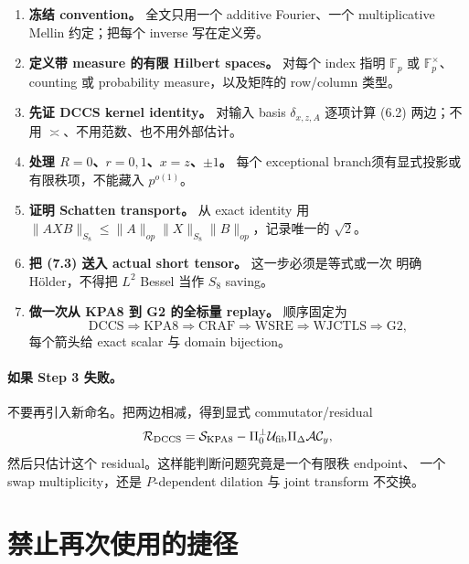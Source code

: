 \documentclass[11pt,a4paper]{ctexart}
\theoremstyle{definition}
\newcommand{\F}{\mathbb F}
\begin{document}
\begin{enumerate}[label=\textbf{Step \arabic*.}]
\item \textbf{冻结 convention。} 全文只用一个 additive Fourier、一个
multiplicative Mellin 约定；把每个 inverse 写在定义旁。
\item \textbf{定义带 measure 的有限 Hilbert spaces。} 对每个 index 指明
$\F_p$ 或 $\F_p^\times$、counting 或 probability measure，以及矩阵的 row/column 类型。
\item \textbf{先证 DCCS kernel identity。} 对输入 basis
$\delta_{x,z,A}$ 逐项计算 (6.2) 两边；不用 $\asymp$、不用范数、也不用外部估计。
\item \textbf{处理 $R=0$、$r=0,1$、$x=z$、$\pm1$。} 每个 exceptional
branch须有显式投影或有限秩项，不能藏入 $p^{o(1)}$。
\item \textbf{证明 Schatten transport。} 从 exact identity 用
$\|AXB\|_{S_8}\le\|A\|_{op}\|X\|_{S_8}\|B\|_{op}$，记录唯一的 $\sqrt2$。
\item \textbf{把 (7.3) 送入 actual short tensor。} 这一步必须是等式或一次
明确 Hölder，不得把 $L^2$ Bessel 当作 $S_8$ saving。
\item \textbf{做一次从 KPA8 到 G2 的全标量 replay。} 顺序固定为
\[
\mathrm{DCCS}\Rightarrow\mathrm{KPA8}\Rightarrow\mathrm{CRAF}
\Rightarrow\mathrm{WSRE}\Rightarrow\mathrm{WJCTLS}\Rightarrow\mathrm{G2},
\]
每个箭头给 exact scalar 与 domain bijection。
\end{enumerate}

\paragraph{如果 Step 3 失败。}
不要再引入新命名。把两边相减，得到显式 commutator/residual
\[
\mathcal R_{\rm DCCS}
=\mathcal S_{\rm KPA8}
-\Pi_0^\perp\mathcal U_{\rm fib}\Pi_\Delta\mathcal A\mathcal C_y,
\]
然后只估计这个 residual。这样能判断问题究竟是一个有限秩 endpoint、
一个 swap multiplicity，还是 $P$-dependent dilation 与 joint transform 不交换。

\section{禁止再次使用的捷径}
\end{document}
